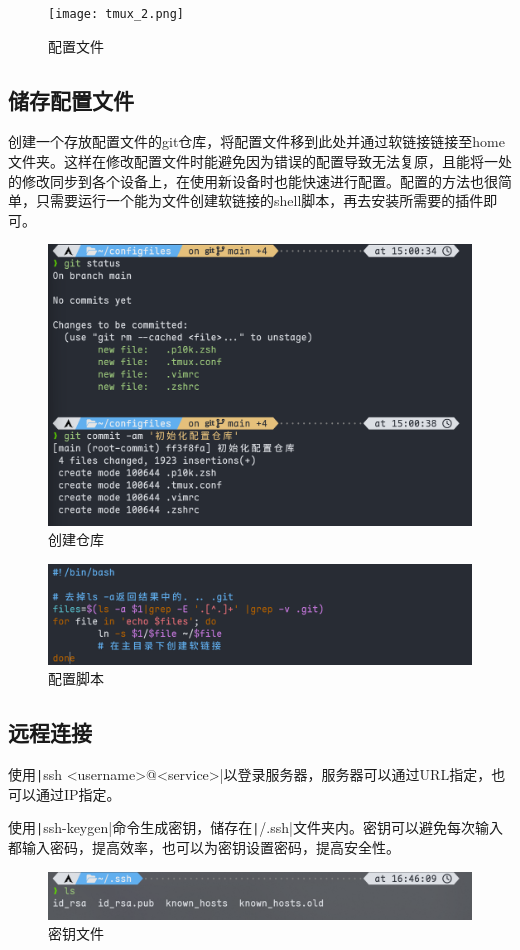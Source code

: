 \documentclass[fontset=ubuntu]{ctexart}
\begin{document}
\begin{figure}[htb]
    \centering
    \texttt{[image: tmux\_2.png]}
    \caption{配置文件}
    \label{fig:tmux_2}
\end{figure}

\subsection{储存配置文件}
创建一个存放配置文件的git仓库，将配置文件移到此处并通过软链接链接至home文件夹。这样在修改配置文件时能避免因为错误的配置导致无法复原，且能将一处的修改同步到各个设备上，在使用新设备时也能快速进行配置。配置的方法也很简单，只需要运行一个能为文件创建软链接的shell脚本，再去安装所需要的插件即可。
\begin{figure}[htb]
    \centering
    \includegraphics[width=0.75\linewidth]{config_1.png}
    \caption{创建仓库}
    \label{fig:config_1}
\end{figure}

\begin{figure}[htb]
    \centering
    \includegraphics[width=0.75\linewidth]{config_2.png}
    \caption{配置脚本}
    \label{fig:config_2}
\end{figure}

\subsection{远程连接}
使用\texttt|ssh <username>@<service>|以登录服务器，服务器可以通过URL指定，也可以通过IP指定。

使用\texttt|ssh-keygen|命令生成密钥，储存在\texttt|/.ssh|文件夹内。密钥可以避免每次输入都输入密码，提高效率，也可以为密钥设置密码，提高安全性。
\begin{figure}[htb]
    \centering
    \includegraphics[width=0.75\linewidth]{ssh_1.png}
    \caption{密钥文件}
    \label{fig:ssh_1}
\end{figure}
\end{document}
